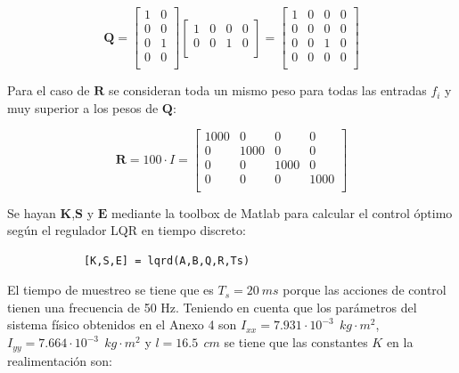 \documentclass[twoside,11pt]{book}
\begin{document}
\begin{equation}
\mathbf{Q}= \left[ \begin{array}{cc}
1 & 0 \\
0 & 0 \\
0 & 1 \\
0 & 0 \\ \end{array} \right] \left[ \begin{array}{cccc}
1 & 0 & 0 & 0 \\
0 & 0 & 1 & 0 \\ \end{array} \right] = \left[ \begin{array}{cccc}
1 & 0 & 0 & 0 \\
0 & 0 & 0 & 0 \\
0 & 0 & 1 & 0 \\
0 & 0 & 0 & 0 \\ \end{array} \right]
\end{equation}

Para el caso de $\mathbf{R}$ se consideran toda un mismo peso para todas las entradas $f_i$ y muy superior a los pesos de $\mathbf{Q}$: 

\begin{equation}
\mathbf{R}=100 \cdot I = \left[ \begin{array}{cccc}
1000 &   0 &   0 &   0 \\
0   & 1000 &   0 &   0 \\
0   &   0 & 1000 &   0 \\
0   &   0 &   0 & 1000 \\ \end{array} \right] 
\end{equation}

Se hayan $\mathbf{K}$,$\mathbf{S}$ y $ \mathbf{E}$ mediante la toolbox de Matlab para calcular el control óptimo según el regulador LQR\cite{Toolbox_lqr} en tiempo discreto:

\begin{verbatim}
            [K,S,E] = lqrd(A,B,Q,R,Ts)
\end{verbatim}

El tiempo de muestreo se tiene que es $T_{s}=20\>ms$ porque las acciones de control tienen una frecuencia de 50 Hz. Teniendo en cuenta que los parámetros del sistema físico obtenidos en el Anexo 4 son $I_{xx}=7.931\cdot 10^{-3} \>\> kg \cdot m^{2}$, $I_{yy}=7.664\cdot 10^{-3}\>\> kg \cdot m^{2}$ y $l=16.5 \>\> cm$ se tiene que las constantes $K$ en la realimentación son:
\end{document}
